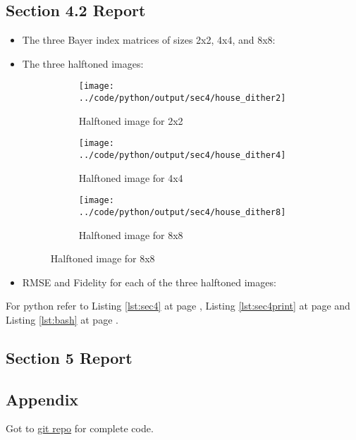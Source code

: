 \documentclass[a4paper,11pt]{article}
\newcommand{\reflst}[1]{Listing \ref{#1} at page \pageref{#1}}
\begin{document}
\subsection*{Section 4.2 Report} 
\begin{itemize}
\item The three Bayer index matrices of sizes 2x2, 4x4, and 8x8:
    
 
\item The three halftoned images:
\begin{figure}[!hp]
  \centering
 \begin{subfigure}{0.3\textwidth}
  \texttt{[image: ../code/python/output/sec4/house\_dither2]}
 \caption{Halftoned image for 2x2}
 \end{subfigure}
 \begin{subfigure}{0.3\textwidth}
  \texttt{[image: ../code/python/output/sec4/house\_dither4]}
 \caption{Halftoned image for 4x4}
 \end{subfigure}
 \begin{subfigure}{0.3\textwidth}
  \texttt{[image: ../code/python/output/sec4/house\_dither8]}
 \caption{Halftoned image for 8x8}
 \end{subfigure}
 \end{figure}
 
\item RMSE and Fidelity for each of the three halftoned images:
 
 
 
\end{itemize} 
For python refer to \reflst{lst:sec4}, \reflst{lst:sec4print} and \reflst{lst:bash}.

\clearpage
\subsection*{Section 5 Report} 

\clearpage
\subsection*{Appendix}
Got to \href{https://github.com/rahuldeshmukh43/Courses/tree/master/ECE637-DigitalImageProcessing-I/labs/lab8/code/}{git repo} for complete code.






\end{document}

